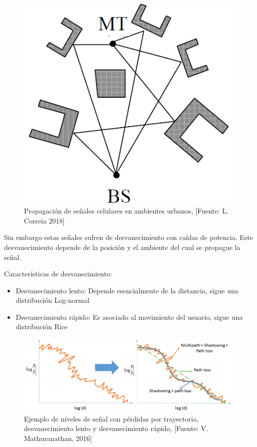 \begin{figure}[th]
\centering
\includegraphics[scale=.5]{Figures/Propagación de señales celulares en ambientes urbanos.}
\decoRule
\caption[Propagación de señales celulares en ambientes urbanos]{Propagación de señales celulares en ambientes urbanos, [Fuente: L. Correia 2018]}
\label{fig:Propagacion}
\end{figure}

Sin embargo estas señales sufren de desvanecimiento con caídas de potencia. Este desvanecimiento depende de la posición y el ambiente del cual se propague la señal.\newline

Características de desvanecimiento:
\begin{itemize}
    \item Desvanecimiento lento:
    Depende esencialmente de la distancia, sigue una distribución Log-normal
    \item Desvanecimiento rápido:
    Es asociado al movimiento del usuario, sigue una distribución Rice
\end{itemize}

\begin{figure}[th]
\centering
\includegraphics[scale=.8]{Figures/Ejemplo de niveles de señal con desvanecimiento lento y desvanecimiento rápido}
\decoRule
\caption[Ejemplo de niveles de señal con pérdidas por trayectoria, desvanecimiento lento y desvanecimiento rápido]{Ejemplo de niveles de señal con pérdidas por trayectoria, desvanecimiento lento y desvanecimiento rápido, [Fuente: V. Mathuranathan, 2016]}
\label{fig:Desvanecimientos}
\end{figure}

